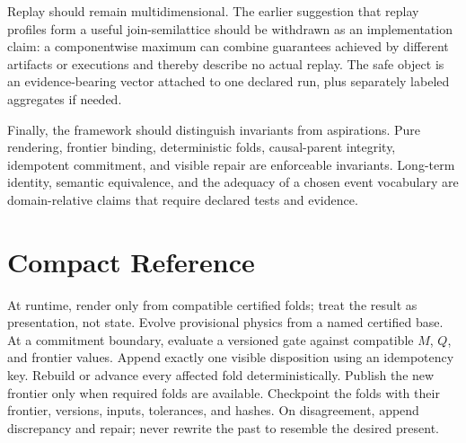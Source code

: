 \documentclass[11pt]{article}
\begin{document}
Replay should remain multidimensional. The earlier suggestion that replay profiles form a useful join-semilattice should be withdrawn as an implementation claim: a componentwise maximum can combine guarantees achieved by different artifacts or executions and thereby describe no actual replay. The safe object is an evidence-bearing vector attached to one declared run, plus separately labeled aggregates if needed.

Finally, the framework should distinguish invariants from aspirations. Pure rendering, frontier binding, deterministic folds, causal-parent integrity, idempotent commitment, and visible repair are enforceable invariants. Long-term identity, semantic equivalence, and the adequacy of a chosen event vocabulary are domain-relative claims that require declared tests and evidence.

\section{Compact Reference}

At runtime, render only from compatible certified folds; treat the result as presentation, not state. Evolve provisional physics from a named certified base. At a commitment boundary, evaluate a versioned gate against compatible $M$, $Q$, and frontier values. Append exactly one visible disposition using an idempotency key. Rebuild or advance every affected fold deterministically. Publish the new frontier only when required folds are available. Checkpoint the folds with their frontier, versions, inputs, tolerances, and hashes. On disagreement, append discrepancy and repair; never rewrite the past to resemble the desired present.
\end{document}

